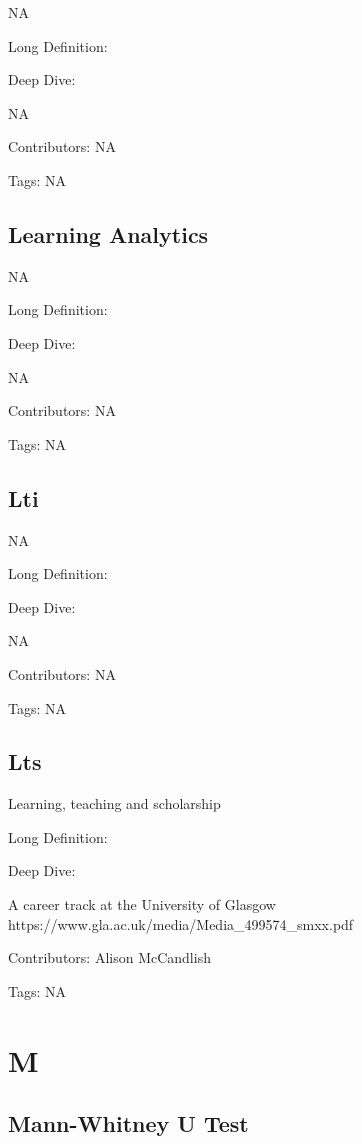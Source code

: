 \documentclass[
  letterpaper,
  DIV=11,
  numbers=noendperiod]{scrreprt}
\begin{document}
NA

Long Definition:

Deep Dive:

NA

Contributors: NA

Tags: NA

\section{Learning Analytics}\label{learning-analytics}

NA

Long Definition:

Deep Dive:

NA

Contributors: NA

Tags: NA

\section{Lti}\label{lti}

NA

Long Definition:

Deep Dive:

NA

Contributors: NA

Tags: NA

\section{Lts}\label{lts}

Learning, teaching and scholarship

Long Definition:

Deep Dive:

A career track at the University of Glasgow
https://www.gla.ac.uk/media/Media\_499574\_smxx.pdf

Contributors: Alison McCandlish

Tags: NA


\chapter{M}\label{m}

\section{Mann-Whitney U Test}\label{mann-whitney-u-test}
\end{document}
